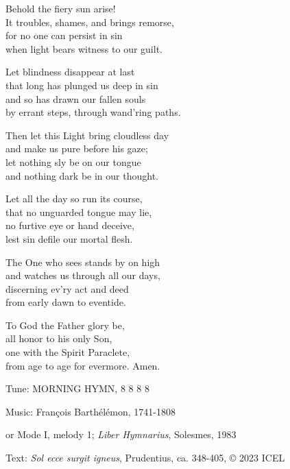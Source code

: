 \hymn

\begin{hymnverse}
Behold the fiery sun arise!\\
It troubles, shames, and brings remorse,\\
for no one can persist in sin\\
when light bears witness to our guilt.

Let blindness disappear at last\\
that long has plunged us deep in sin\\
and so has drawn our fallen souls\\
by errant steps, through wand’ring paths.

Then let this Light bring cloudless day\\
and make us pure before his gaze;\\
let nothing sly be on our tongue\\
and nothing dark be in our thought.

Let all the day so run its course,\\
that no unguarded tongue may lie,\\
no furtive eye or hand deceive,\\
lest sin defile our mortal flesh.

The One who sees stands by on high\\
and watches us through all our days,\\
discerning ev’ry act and deed\\
from early dawn to eventide.

To God the Father glory be,\\
all honor to his only Son,\\
one with the Spirit Paraclete,\\
from age to age for evermore. Amen.
\end{hymnverse}

\begin{hymnsource}
Tune: MORNING HYMN, 8 8 8 8

Music: François Barthélémon, 1741-1808

or Mode I, melody 1; \emph{Liber Hymnarius}, Solesmes, 1983

Text: \emph{Sol ecce surgit igneus}, Prudentius, ca. 348-405, © 2023 ICEL
\end{hymnsource}